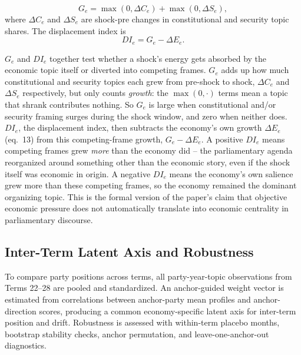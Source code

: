 \documentclass[conference]{IEEEtran}
\begin{document}
\begin{equation}
G_e = \max(0,\Delta C_e) + \max(0,\Delta S_e),
\end{equation}
where $\Delta C_e$ and $\Delta S_e$ are shock-pre changes in constitutional and security topic shares. The displacement index is
\begin{equation}
DI_e = G_e - \Delta E_e.
\end{equation}

$G_e$ and $DI_e$ together test whether a shock's energy gets absorbed by the economic topic itself or diverted into competing frames. $G_e$ adds up how much constitutional and security topics each grew from pre-shock to shock, $\Delta C_e$ and $\Delta S_e$ respectively, but only counts \emph{growth}: the $\max(0, \cdot)$ terms mean a topic that shrank contributes nothing. So $G_e$ is large when constitutional and/or security framing surges during the shock window, and zero when neither does. $DI_e$, the displacement index, then subtracts the economy's own growth $\Delta E_e$ (eq.~13) from this competing-frame growth, $G_e - \Delta E_e$. A positive $DI_e$ means competing frames grew \emph{more} than the economy did -- the parliamentary agenda reorganized around something other than the economic story, even if the shock itself was economic in origin. A negative $DI_e$ means the economy's own salience grew more than these competing frames, so the economy remained the dominant organizing topic. This is the formal version of the paper's claim that objective economic pressure does not automatically translate into economic centrality in parliamentary discourse.

\subsection{Inter-Term Latent Axis and Robustness}
To compare party positions across terms, all party-year-topic observations from Terms 22--28 are pooled and standardized. An anchor-guided weight vector is estimated from correlations between anchor-party mean profiles and anchor-direction scores, producing a common economy-specific latent axis for inter-term position and drift. Robustness is assessed with within-term placebo months, bootstrap stability checks, anchor permutation, and leave-one-anchor-out diagnostics.
\end{document}

